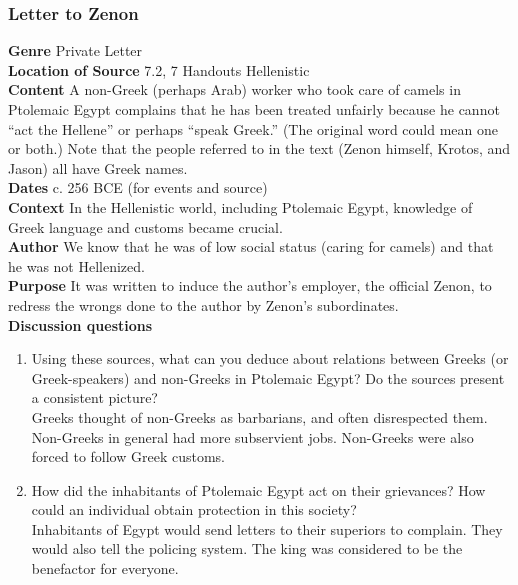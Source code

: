 \documentclass{article}
\begin{document}
\subsubsection*{Letter to Zenon}
\textbf{Genre}
Private Letter \\
\textbf{Location of Source}
7.2, 7 Handouts Hellenistic \\
\textbf{Content}
A non-Greek (perhaps Arab) worker who took care of camels in Ptolemaic Egypt complains
that he has been treated unfairly because he cannot “act the Hellene” or perhaps “speak
Greek.”  (The original word could mean one or both.)  Note that the people referred to in the
text (Zenon himself, Krotos, and Jason) all have Greek names. \\
\textbf{Dates}
c. 256 BCE (for events and source) \\
\textbf{Context}
In the Hellenistic world, including Ptolemaic Egypt, knowledge of Greek language and
customs became crucial. \\
\textbf{Author}
We know that he was of low social status (caring for camels) and that he was not Hellenized. \\
\textbf{Purpose}
It was written to induce the author’s employer, the official Zenon, to redress the wrongs
done to the author by Zenon’s subordinates. \\
\textbf{Discussion questions}
\begin{enumerate}
  \item Using these sources, what can you deduce about relations between Greeks (or
  Greek-speakers) and non-Greeks in Ptolemaic Egypt? Do the sources present a consistent picture? \\
  Greeks thought of non-Greeks as barbarians, and often disrespected them. Non-Greeks in
  general had more subservient jobs. Non-Greeks were also forced to follow Greek customs.
  \item How did the inhabitants of Ptolemaic Egypt act on their grievances? How could an
  individual obtain protection in this society? \\
  Inhabitants of Egypt would send letters to their superiors to complain. They would also tell
  the policing system. The king was considered to be the benefactor for everyone.
\end{enumerate}
\end{document}
